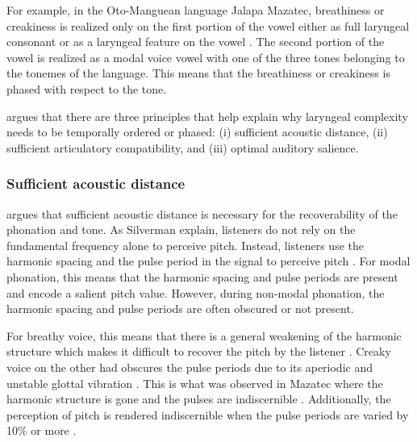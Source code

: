 For example, in the Oto-Manguean language Jalapa Mazatec, breathiness or creakiness is realized only on the first portion of the vowel either as full laryngeal consonant or as a laryngeal feature on the vowel \citep[238]{silvermanLaryngealComplexityOtomanguean1997}. The second portion of the vowel is realized as a modal voice vowel with one of the three tones belonging to the tonemes of the language. This means that the breathiness or creakiness is phased with respect to the tone.

\citeauthor{silvermanLaryngealComplexityOtomanguean1997} argues that there are three principles that help explain why laryngeal complexity needs to be temporally ordered or phased: (i) sufficient acoustic distance, (ii) sufficient articulatory compatibility, and (iii) optimal auditory salience. 

\subsubsection{Sufficient acoustic distance}\label{sec:sufficient_acoustic_distance}

\citet{silvermanLaryngealComplexityOtomanguean1997} argues that sufficient acoustic distance is necessary for the recoverability of the phonation and tone. As Silverman explain, listeners do not rely on the fundamental frequency alone to perceive pitch. Instead, listeners use the harmonic spacing and the pulse period in the signal to perceive pitch \citep{ritsmaFrequenciesDominantPerception1967,remezIntonationSinusoidalSentences1993}. For modal phonation, this means that the harmonic spacing and pulse periods are present and encode a salient pitch value. However, during non-modal phonation, the harmonic spacing and pulse periods are often obscured or not present.

For breathy voice, this means that there is a general weakening 
of the harmonic structure which makes it difficult to recover the pitch by the listener \citep{silvermanPhasingRecoverability1997}. Creaky voice on the other had obscures the pulse periods due to its aperiodic and unstable glottal vibration \citep{ladefogedSoundsWorldLanguages1996}. This is what was observed in Mazatec where the harmonic structure is gone and the pulses are indiscernible \citep{kirkQuantifyingAcousticProperties1993}. Additionally, the perception of pitch is rendered indiscernible when the pulse periods are varied by 10\% or more \citep{rosenbergPitchDiscriminationJittered1966}.

